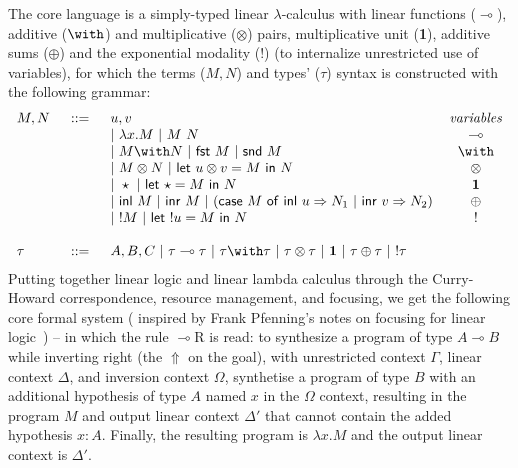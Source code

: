 \documentclass{llncs}
\newcommand{\lolli}{\multimap}
\newcommand{\tensor}{\otimes}
\newcommand{\bang}{{!}}
\newcommand{\llet}[2]{\mathsf{let}\ #1\ \mathsf{in}\ #2}
\begin{document}
The core language is a simply-typed linear $\lambda$-calculus with linear
functions ($\lolli$), additive ($\with$) and multiplicative ($\tensor$) pairs,
multiplicative unit (\textbf{1}), additive sums ($\oplus$)
and the exponential modality ($\bang$) (to internalize unrestricted use of variables), for
which the terms ($M,N$) and types' ($\tau$) syntax is constructed with the
following grammar:
%
\[
\begin{tabular}{lclc}
$M,N$ & $\ ::=\ $ & $u, v$ & \emph{variables} \\
    & & $\vert\ \lambda x. M\ \vert\ M\ N$ & $\lolli$ \\
    & & $\vert\ M \with N\ \vert\ \mathsf{fst}\ M\ \vert\ \mathsf{snd}\ M$ & $\with$ \\
    & & $\vert\ M \tensor N\ \vert\ \llet{u\tensor v = M}{N}$ & $\tensor$ \\
    & & $\vert\ \star\ \vert\ \llet{\star = M}{N}$ & $\textbf{1}$ \\
    & & $\vert\ \mathsf{inl}\ M\ \vert\ \mathsf{inr}\ M\ \vert\ (\mathsf{case}\
    M\ \mathsf{of\ inl}\ u \Rightarrow N_1\ \vert\ \mathsf{inr}\ v \Rightarrow
    N_2)$ & $\oplus$ \\
    & & $\vert\ \bang M\ \vert\ \llet{\bang u = M}{N}$ & $\bang$ \\
    \\
$\tau$ & $\ ::=\ $ & $A, B, C\ \vert\ \tau \lolli \tau\ \vert\ \tau \with \tau\
    \vert\ \tau \tensor \tau\ \vert\ \textbf{1}\ \vert\ \tau \oplus \tau\ \vert\ \bang \tau$
\end{tabular}
\]
%
Putting together linear logic and linear lambda calculus through the Curry-Howard correspondence, resource
management, and focusing, we get the following core formal system (%
inspired
by Frank Pfenning's notes on focusing for linear logic~\cite{FPnotes...}) -- in which the
rule $\lolli$R is read: to synthesize a program of type $A \lolli B$ while inverting
right (the $\Uparrow$ on the goal), with unrestricted context $\Gamma$, linear
context $\Delta$, and inversion context $\Omega$, synthetise a program of type $B$ with
an additional hypothesis of type $A$ named $x$ in the $\Omega$ context,
resulting in the program $M$ and output linear
context $\Delta'$ that cannot contain the added hypothesis $x{:}A$. Finally, the
resulting program is $\lambda x . M$ and the output linear context is
$\Delta'$.
\end{document}
